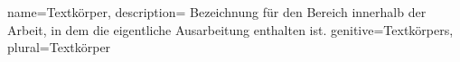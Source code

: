 

{
	name=Textkörper,
	description={
			Bezeichnung für den Bereich innerhalb der Arbeit, in dem die eigentliche Ausarbeitung enthalten ist.
		}
	genitive=Textkörpers,
	plural=Textkörper
}

